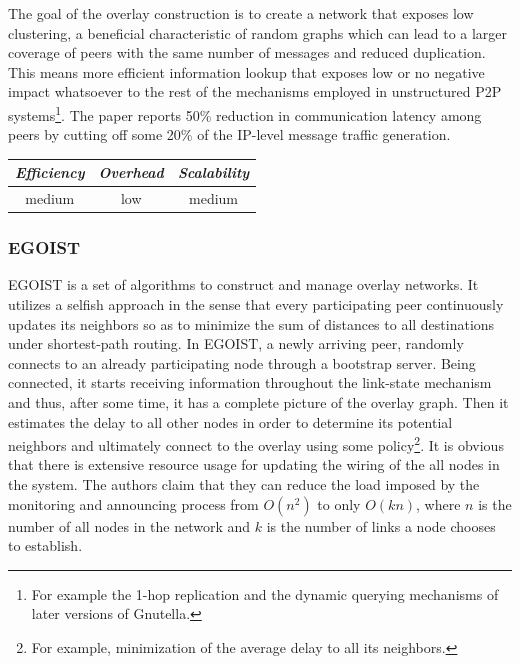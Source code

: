 The goal of the overlay construction is to create a network that exposes low
clustering, a beneficial characteristic of random graphs which can lead to a
larger coverage of peers with the same number of messages and reduced
duplication. This means more efficient information lookup that exposes low or no
negative impact whatsoever to the rest of the mechanisms employed in
unstructured P2P systems\footnote{For example the 1-hop replication and the
dynamic querying mechanisms of later versions of Gnutella.}. The paper reports
50\% reduction in communication latency among peers by cutting off some 20\% of
the IP-level message traffic generation.

\begin{center}
\begin{tabular}{ccc}
\emph{Efficiency} & \emph{Overhead} & \emph{Scalability} \\
\hline
medium &
low &
medium
\end{tabular}
\end{center}

\subsubsection{EGOIST}
EGOIST \cite{SLLBBR2008} is a set of algorithms to construct and manage overlay
networks. It utilizes a selfish approach in the sense that every participating
peer continuously updates its neighbors so as to minimize the sum of distances
to all destinations under shortest-path routing. In EGOIST, a newly arriving
peer, randomly connects to an already participating node through a bootstrap
server. Being connected, it starts receiving information throughout the
link-state mechanism and thus, after some time, it has a complete picture of the
overlay graph. Then it estimates the delay to all other nodes in order to
determine its potential neighbors and ultimately connect to the overlay using
some policy\footnote{For example, minimization of the average delay to all its
neighbors.}. It is obvious that there is extensive resource usage for updating
the wiring of the all nodes in the system. The authors claim that they can
reduce the load imposed by the monitoring and announcing process from $O(n^2)$
to only $O(kn)$, where $n$ is the number of all nodes in the network and $k$ is
the number of links a node chooses to establish.

